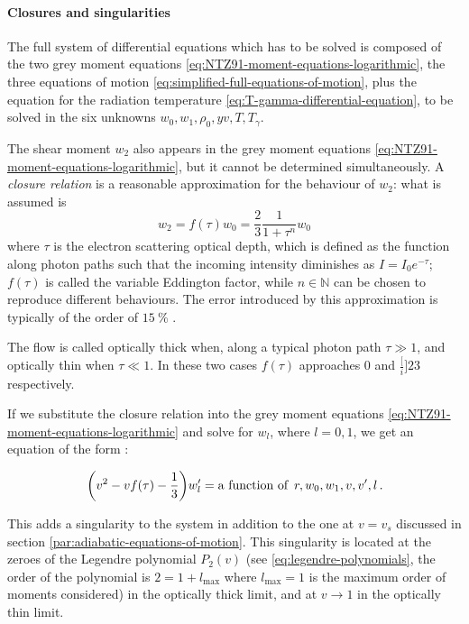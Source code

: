 \documentclass[main.tex]{subfiles}
\begin{document}
\paragraph{Closures and singularities} \label{sec:closures-singularities}

The full system of differential equations which has to be solved is composed of the two grey moment equations \eqref{eq:NTZ91-moment-equations-logarithmic}, the three equations of motion \eqref{eq:simplified-full-equations-of-motion}, plus the equation for the radiation temperature \eqref{eq:T-gamma-differential-equation}, to be solved in the six unknowns \(w_0, w_1, \rho_0, yv, T, T_\gamma\).

The shear moment \(w_2\) also appears in the grey moment equations \eqref{eq:NTZ91-moment-equations-logarithmic}, but it cannot be determined simultaneously. A \emph{closure relation} is a reasonable approximation for the behaviour of \(w_2\): what is assumed is
%
\begin{equation}
  w_2 = f(\tau) w_0 = \frac{2}{3} \frac{1}{1+ \tau^n} w_0
\end{equation}
%
where \(\tau\) is the electron scattering optical depth, which is defined \cite[eqs. 1.25, 1.26]{RybickiLightman:2004} as the function along photon paths such that the incoming intensity diminishes as \(I = I_0 e^{-\tau}\); \(f(\tau)\) is called the variable Eddington factor, while \(n \in \mathbb N\) can be chosen to reproduce different behaviours.
The error introduced by this approximation is typically of the order of \(\SI{15}{\percent}\) \cite[]{TurollaNobili:1988}.

The flow is called optically thick when, along a typical photon path \(\tau \gg 1\), and optically thin when \(\tau \ll 1\).
In these two cases \(f(\tau)\) approaches 0 and \(\frac[i]{2}{3}\) respectively.

If we substitute the closure relation into the grey moment equations \eqref{eq:NTZ91-moment-equations-logarithmic} and solve for \(w_l\), where \(l=0,1\), we get an equation of the form \cite[eq. 18]{NobiliTurollaZampieri:1991dec}:

\begin{equation}
  \qty(v^2 - v f(\tau) - \frac{1}{3}) w_l^{\prime} = \text{a function of }\, r, w_0, w_1, v, v', l \,.
\end{equation}

This adds a singularity to the system in addition to the one at \(v=v_s\) discussed in section \ref{par:adiabatic-equations-of-motion}. This singularity is located at the zeroes of the Legendre polynomial \(P_2 (v)\) (see \eqref{eq:legendre-polynomials}, the order of the polynomial is \(2 = 1+ l_{\text{max}}\) where \(l_{\text{max}}=1\) is the maximum order of moments considered) in the optically thick limit, and at \(v \rightarrow 1\) in the optically thin limit.
\end{document}
